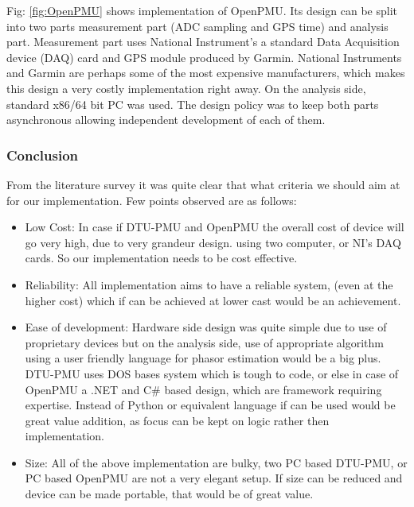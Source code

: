 Fig: \ref{fig:OpenPMU} shows implementation of OpenPMU. Its design can be split into two parts measurement part (ADC sampling and GPS time) and analysis part. Measurement part uses National Instrument's a standard Data Acquisition device (DAQ) card and GPS module produced by Garmin. National Instruments  and Garmin are perhaps some of the most expensive manufacturers, which makes this design a very costly implementation right away. On the analysis side, standard x86/64 bit PC was used. The design policy was to keep both parts asynchronous allowing independent development of each of them.
 
 \subsubsection{Conclusion}
 From the literature survey it was quite clear that what criteria we should aim at for our implementation. Few points observed are as follows:
 \begin{itemize}
 	\item Low Cost: In case if DTU-PMU and OpenPMU the overall cost of device will go very high, due to very grandeur design. using two computer, or NI's DAQ cards. So our implementation needs to be cost effective.
 	\item Reliability: All implementation aims to have a reliable system, (even at the higher cost) which if can be achieved at lower cast would be an achievement.
 	\item Ease of development: Hardware side design was quite simple due to use of proprietary devices but on the analysis side, use of appropriate algorithm using a user friendly language for phasor estimation would be a big plus. DTU-PMU uses DOS bases system which is tough to code, or else in case of OpenPMU a .NET and C\# based design, which are framework requiring  expertise. Instead of Python or equivalent language if can be used would be great value addition, as focus can be kept on logic rather then implementation.
 	\item Size: All of the above implementation are bulky, two PC based DTU-PMU, or PC based OpenPMU are not a very elegant setup. If size can be reduced and device can be made portable, that would be of great value.
 \end{itemize} 
 

